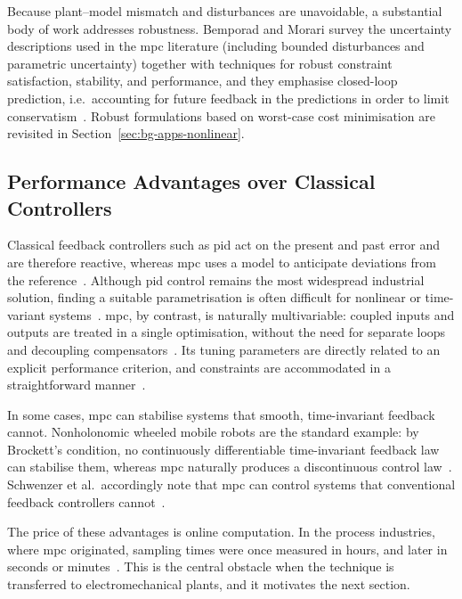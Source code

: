 Because plant--model mismatch and disturbances are unavoidable, a substantial body of work addresses robustness. Bemporad and Morari survey the uncertainty descriptions used in the \ac{mpc} literature (including bounded disturbances and parametric uncertainty) together with techniques for robust constraint satisfaction, stability, and performance, and they emphasise closed-loop prediction, i.e.\ accounting for future feedback in the predictions in order to limit conservatism~\cite{bemporad1999}. Robust formulations based on worst-case cost minimisation are revisited in Section~\ref{sec:bg-apps-nonlinear}.

\subsection{Performance Advantages over Classical Controllers}\label{sec:bg-mpc-advantages}

Classical feedback controllers such as \ac{pid} act on the present and past error and are therefore reactive, whereas \ac{mpc} uses a model to anticipate deviations from the reference~\cite{schwenzer2021}. Although \ac{pid} control remains the most widespread industrial solution, finding a suitable parametrisation is often difficult for nonlinear or time-variant systems~\cite{schwenzer2021}. \ac{mpc}, by contrast, is naturally multivariable: coupled inputs and outputs are treated in a single optimisation, without the need for separate loops and decoupling compensators~\cite{rawlings2000,bemporad1999}. Its tuning parameters are directly related to an explicit performance criterion, and constraints are accommodated in a straightforward manner~\cite{kuhne2005}.

In some cases, \ac{mpc} can stabilise systems that smooth, time-invariant feedback cannot. Nonholonomic wheeled mobile robots are the standard example: by Brockett's condition, no continuously differentiable time-invariant feedback law can stabilise them, whereas \ac{mpc} naturally produces a discontinuous control law~\cite{kuhne2004}. Schwenzer et al.\ accordingly note that \ac{mpc} can control systems that conventional feedback controllers cannot~\cite{schwenzer2021}.

The price of these advantages is online computation. In the process industries, where \ac{mpc} originated, sampling times were once measured in hours, and later in seconds or minutes~\cite{schwenzer2021,wang2010}. This is the central obstacle when the technique is transferred to electromechanical plants, and it motivates the next section.

